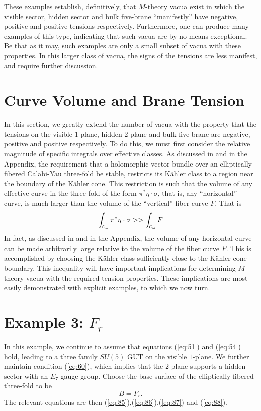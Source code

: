 \documentclass[a4paper,12pt]{article}
\numberwithin{equation}{section}
\theoremstyle{plain}
\begin{document}
These examples establish, definitively, that $M$-theory vacua exist
in which the visible sector, hidden sector and bulk five-brane ``manifestly'' 
have negative, positive and positive tensions respectively. 
Furthermore, one can produce many examples of this type, indicating that such
vacua are by no means exceptional. Be that as it may, such 
examples are only a small subset of vacua with these properties. In this
larger class of vacua, the signs of the tensions are less manifest, and 
require further discussion. 

\section{Curve Volume and Brane Tension}

In this section, we greatly
extend the number of vacua with the property that the tensions on the visible
$1$-plane, hidden $2$-plane and bulk five-brane are negative, positive and
positive respectively. To do this, we must first
consider the relative magnitude of specific integrals over effective classes. As
discussed in \cite{RD4} and in the Appendix, the requirement that a 
holomorphic vector bundle over an elliptically fibered Calabi-Yau three-fold be
stable, restricts its K\"{a}hler class to a region near the 
boundary of the K\"{a}hler cone.
This restriction is such that the volume of any effective 
curve in the three-fold of the form $\pi^{*}\eta\cdot\sigma$, that is, 
any ``horizontal'' 
curve, is much larger than the volume of the ``vertical'' fiber
curve $F$. That is
%
\begin{equation}
\int_{{\cal{C}}_{\omega}}{\pi^{*}\eta\cdot\sigma} >> \int_{{\cal{C}}_{\omega}}{F}
\label{eq:100}
\end{equation}
%
In fact, as discussed in \cite{RD4} and in the Appendix, 
the volume of any horizontal curve can 
be made arbitrarily large relative to the volume of the fiber curve $F$. This
is accomplished by choosing the K\"{a}hler class sufficiently 
close to the K\"{a}hler 
cone boundary. This inequality will have important implications for determining
$M$-theory vacua with the required tension properties. These implications are 
most easily demonstrated with explicit examples, to which we now turn.

\section*{Example 3: $F_{r}$}

In this example, we continue to assume that equations (\ref{eq:51}) and
(\ref{eq:54}) hold, leading to a three family $SU(5)$ GUT on the visible
$1$-plane. We further maintain condition (\ref{eq:60}), which implies that the
$2$-plane supports a hidden sector with an $E_{7}$ gauge group. Choose the
base surface of the elliptically fibered three-fold to be
%
\begin{equation}
B=F_{r}.
\label{eq:101}
\end{equation}
%
The relevant equations are then (\ref{eq:85}),(\ref{eq:86}),(\ref{eq:87}) and
(\ref{eq:88}).
\end{document}
